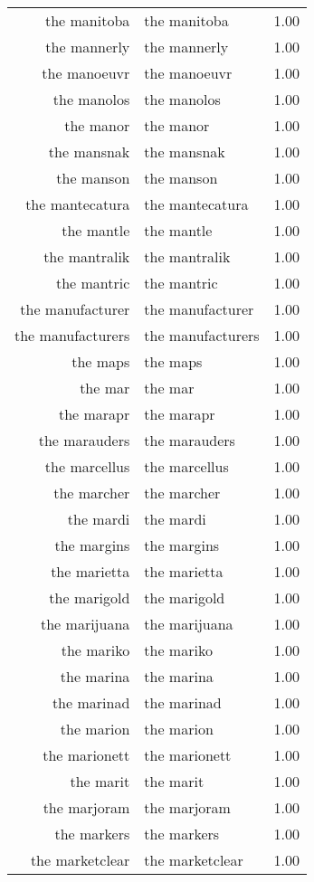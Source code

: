\begin{table}[ht]
\begin{tabular}{rlr}
  the manitoba & the manitoba & 1.00 \\ 
  the mannerly & the mannerly & 1.00 \\ 
  the manoeuvr & the manoeuvr & 1.00 \\ 
  the manolos & the manolos & 1.00 \\ 
  the manor & the manor & 1.00 \\ 
  the mansnak & the mansnak & 1.00 \\ 
  the manson & the manson & 1.00 \\ 
  the mantecatura & the mantecatura & 1.00 \\ 
  the mantle & the mantle & 1.00 \\ 
  the mantralik & the mantralik & 1.00 \\ 
  the mantric & the mantric & 1.00 \\ 
  the manufacturer & the manufacturer & 1.00 \\ 
  the manufacturers & the manufacturers & 1.00 \\ 
  the maps & the maps & 1.00 \\ 
  the mar & the mar & 1.00 \\ 
  the marapr & the marapr & 1.00 \\ 
  the marauders & the marauders & 1.00 \\ 
  the marcellus & the marcellus & 1.00 \\ 
  the marcher & the marcher & 1.00 \\ 
  the mardi & the mardi & 1.00 \\ 
  the margins & the margins & 1.00 \\ 
  the marietta & the marietta & 1.00 \\ 
  the marigold & the marigold & 1.00 \\ 
  the marijuana & the marijuana & 1.00 \\ 
  the mariko & the mariko & 1.00 \\ 
  the marina & the marina & 1.00 \\ 
  the marinad & the marinad & 1.00 \\ 
  the marion & the marion & 1.00 \\ 
  the marionett & the marionett & 1.00 \\ 
  the marit & the marit & 1.00 \\ 
  the marjoram & the marjoram & 1.00 \\ 
  the markers & the markers & 1.00 \\ 
  the marketclear & the marketclear & 1.00 \\ 

\end{tabular}
\end{table}
